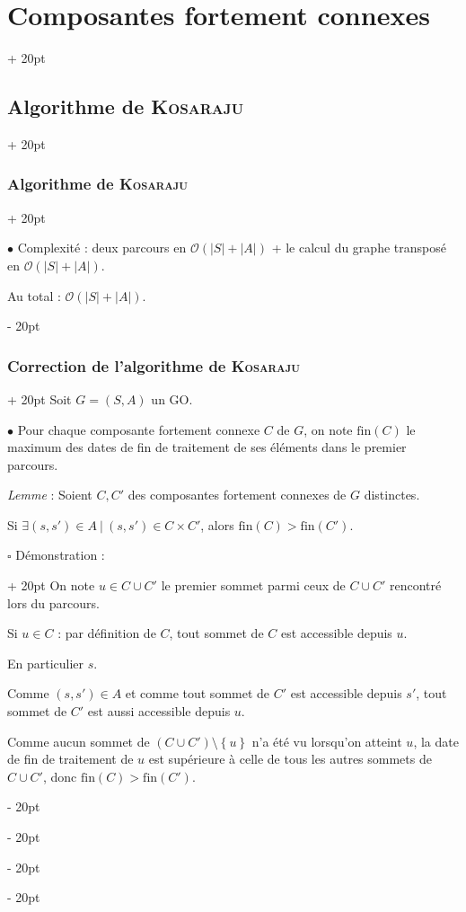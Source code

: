 \documentclass[a4paper, 12pt, twoside]{article}
\newcommand{\set}[1]{\left\{ #1 \right\}}
\newcommand{\abs}[1]{\left\lvert #1 \right\rvert}
\newcommand{\ind}[1][20pt]{\advance\leftskip + #1}
\newcommand{\deind}[1][20pt]{\advance\leftskip - #1}
\newenvironment{indt}[2][20pt]{#2 \par \ind[#1]}{\par \deind} %
\begin{document}
\begin{indt}{\section{Composantes fortement connexes}}
\begin{indt}{\subsection{Algorithme de \textsc{Kosaraju}}}
\begin{indt}{\subsubsection{Algorithme de \textsc{Kosaraju}}}
                \vspace{12pt}
                
                $\bullet$ Complexité :
                deux parcours en $\mathcal O(\abs S + \abs A)$ + le calcul du graphe transposé en $\mathcal O(\abs S + \abs A)$.

                Au total : $\mathcal O(\abs S + \abs A)$.
            \end{indt}

            \begin{indt}{\subsubsection{Correction de l'algorithme de \textsc{Kosaraju}}}
                Soit $G = (S, A)$ un GO.

                $\bullet$ Pour chaque composante fortement connexe $C$ de $G$, on note $\mathrm{fin}(C)$ le maximum des dates de fin de traitement de ses éléments dans le premier parcours.

                \vspace{12pt}
                
                \begin{pseudocode}
                    \textit{Lemme} : Soient $C, C'$ des composantes fortement connexes de $G$ distinctes.

                    Si $\exists (s, s') \in A\ |\ (s, s') \in C \times C'$, alors $\mathrm{fin}(C) > \mathrm{fin}(C')$.
                \end{pseudocode}

                \vspace{12pt}
                
                \begin{indt}{$\square$ Démonstration :}
                    On note $u \in C \cup C'$ le premier sommet parmi ceux de $C \cup C'$ rencontré lors du parcours.

                    Si $u \in C$ : par définition de $C$, tout sommet de $C$ est accessible depuis $u$.

                    En particulier $s$.

                    Comme $(s, s') \in A$ et comme tout sommet de $C'$ est accessible depuis $s'$, tout sommet de $C'$ est aussi accessible depuis $u$.

                    Comme aucun sommet de $(C \cup C') \setminus \set u$ n'a été vu lorsqu'on atteint $u$, la date de fin de traitement de $u$ est supérieure à celle de tous les autres sommets de $C \cup C'$, donc $\mathrm{fin}(C) > \mathrm{fin}(C')$.


\end{indt}
\end{indt}
\end{indt}
\end{indt}
\end{document}
